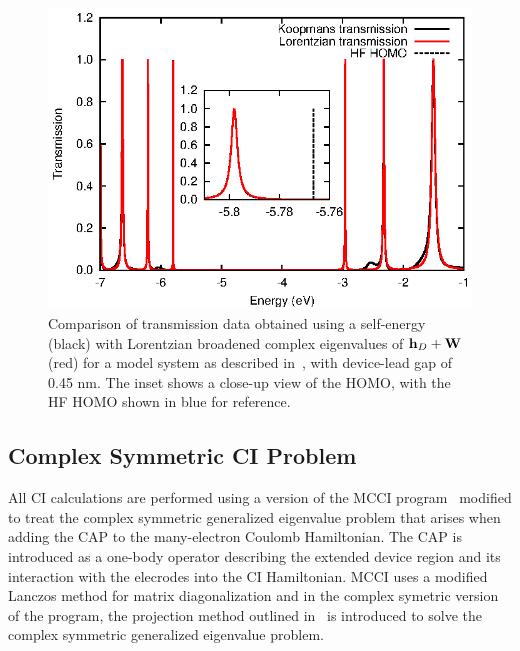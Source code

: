 \begin{figure} 
	\begin{center}
		\includegraphics[width=0.9\linewidth]{figures/figure3}
	\end{center}
	\caption{Comparison of transmission data obtained using a self-energy
	(black) with Lorentzian broadened complex eigenvalues of $\mathbf{h}_D + \mathbf{W}$
	(red) for a model system as described in~,
	with device-lead gap of 0.45 nm.
	The inset shows a close-up view of the \ac{HOMO}, with the HF \ac{HOMO}
	shown in blue for reference.
	}
	\label{fig:13evals}
\end{figure}

\subsection{Complex Symmetric \ac{CI} Problem}

All \ac{CI} calculations  are performed using a version of the \ac{MCCI}
program~\cite{mcci1995, mcci1998} modified to treat the complex
symmetric generalized eigenvalue problem that arises when adding the
\ac{CAP} to the many-electron Coulomb Hamiltonian. The \ac{CAP} is
introduced as a one-body operator describing the extended device region 
and its interaction with the elecrodes into the \ac{CI} Hamiltonian. 
\ac{MCCI} uses a modified Lanczos method for matrix diagonalization and
in the complex symetric version of the program, the projection method
outlined in~\cite{tarantelli_csd} is introduced to solve the complex
symmetric generalized eigenvalue problem. 

